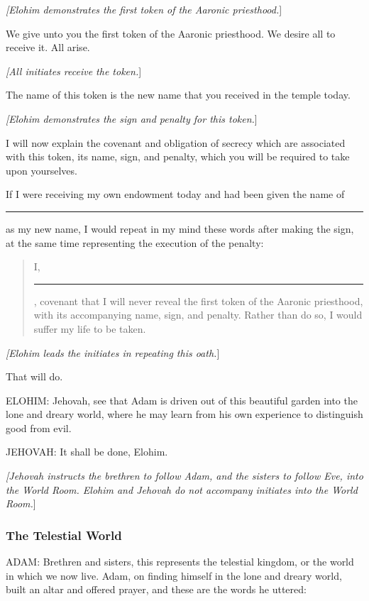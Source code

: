				\textit{[Elohim demonstrates the first token of the Aaronic priesthood.}]

				We give unto you the first token of the Aaronic priesthood. We desire all to receive it. All arise.

				\textit{[All initiates receive the token.}]

				The name of this token is the new name that you received in the temple today.

				\textit{[Elohim demonstrates the sign and penalty for this token.}]

				I will now explain the covenant and obligation of secrecy which are associated with this token, its name, sign, and penalty, which you will be required to take upon yourselves.

				If I were receiving my own endowment today and had been given the name of \rule{1cm}{0.15mm} as my new name, I would repeat in my mind these words after making the sign, at the same time representing the execution of the penalty:

				\begin{quote}
					I, \rule{1cm}{0.15mm}, covenant that I will never reveal the first token of the Aaronic priesthood, with its accompanying name, sign, and penalty. Rather than do so, I would suffer my life to be taken.
				\end{quote}

				\textit{[Elohim leads the initiates in repeating this oath.}]

				That will do.
			
			ELOHIM: Jehovah, see that Adam is driven out of this beautiful garden into the lone and dreary world, where he may learn from his own experience to distinguish good from evil.

			JEHOVAH: It shall be done, Elohim.

			\textit{[Jehovah instructs the brethren to follow Adam, and the sisters to follow Eve, into the World Room. Elohim and Jehovah do not accompany initiates into the World Room.}]
			
		\subsubsection{The Telestial World}
			\label{TEMPLE-ENDOWMENT-ENDOW-PRE-1990-TELESTIAL}
			
			ADAM: Brethren and sisters, this represents the telestial kingdom, or the world in which we now live. Adam, on finding himself in the lone and dreary world, built an altar and offered prayer, and these are the words he uttered:

